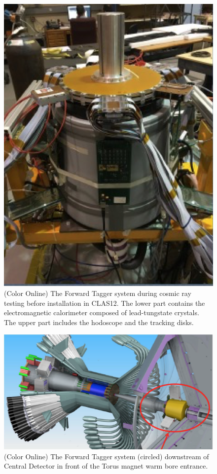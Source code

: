 \documentclass[final,3p,twocolumn]{elsarticle}
\begin{document}
\begin{figure}[htbp!]
\centerline{\includegraphics[width=0.95\columnwidth]{FT-photo.png}}
\caption{(Color Online) The Forward Tagger system during cosmic ray testing before installation in CLAS12. The lower part contains
the electromagnetic calorimeter composed of lead-tungstate crystals. The upper part includes the hodoscope and the
tracking disks.}
\label{ft-photo}
\end{figure}

\begin{figure}[htbp!]
\centerline{\includegraphics[width=1.0\columnwidth]{CD-FT.png}}
\caption{(Color Online) The Forward Tagger system (circled) downstream of Central Detector in front of the Torus magnet warm
bore entrance.}
\label{ft}
\end{figure}
\end{document}

